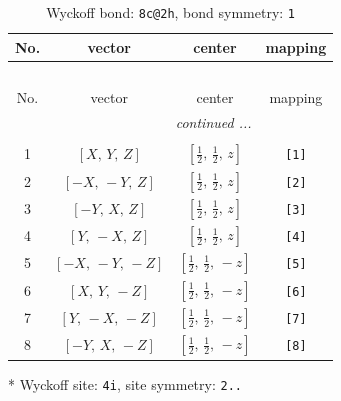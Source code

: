 \documentclass[fleqn,8pt]{jsarticle}
\begin{document}
\begin{longtable}{cccc}
\caption{Wyckoff bond: {\tt 8c@2h}, bond symmetry: {\tt 1}}
 \\
 \hline \hline
No. & vector & center & mapping \\ \hline \endfirsthead

\multicolumn{3}{l}{\tablename\ \thetable{}} \\
 \hline \hline
No. & vector & center & mapping \\ \hline \endhead

 \hline \hline
\multicolumn{3}{r}{\footnotesize\it continued ...} \\ \endfoot

 \hline \hline
\multicolumn{3}{r}{} \\ \endlastfoot

1 & $\left[ X,\, Y,\, Z \right]$ & $\left[ \frac{1}{2},\, \frac{1}{2},\, z \right]$ & {\tt [1]} \\ \hline
2 & $\left[ - X,\, - Y,\, Z \right]$ & $\left[ \frac{1}{2},\, \frac{1}{2},\, z \right]$ & {\tt [2]} \\ \hline
3 & $\left[ - Y,\, X,\, Z \right]$ & $\left[ \frac{1}{2},\, \frac{1}{2},\, z \right]$ & {\tt [3]} \\ \hline
4 & $\left[ Y,\, - X,\, Z \right]$ & $\left[ \frac{1}{2},\, \frac{1}{2},\, z \right]$ & {\tt [4]} \\ \hline
5 & $\left[ - X,\, - Y,\, - Z \right]$ & $\left[ \frac{1}{2},\, \frac{1}{2},\, - z \right]$ & {\tt [5]} \\ \hline
6 & $\left[ X,\, Y,\, - Z \right]$ & $\left[ \frac{1}{2},\, \frac{1}{2},\, - z \right]$ & {\tt [6]} \\ \hline
7 & $\left[ Y,\, - X,\, - Z \right]$ & $\left[ \frac{1}{2},\, \frac{1}{2},\, - z \right]$ & {\tt [7]} \\ \hline
8 & $\left[ - Y,\, X,\, - Z \right]$ & $\left[ \frac{1}{2},\, \frac{1}{2},\, - z \right]$ & {\tt [8]} \\
\end{longtable}
* Wyckoff site: {\tt 4i}, site symmetry: {\tt 2..}
\renewcommand{\arraystretch}{1.2}
\end{document}
